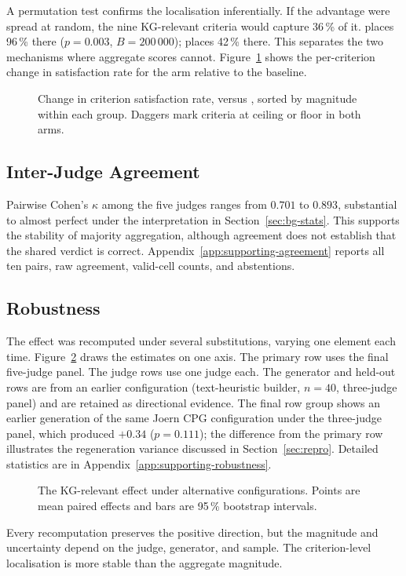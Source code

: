 A permutation test confirms the localisation inferentially. If the advantage
were spread at random, the nine KG-relevant criteria would capture 36\,\% of
it. \kg{} places 96\,\% there ($p = 0.003$, $B =
200\,000$); \rag{} places 42\,\% there. This separates the two
mechanisms where aggregate scores cannot.
Figure~\ref{fig:criterion-localisation} shows the per-criterion change in
satisfaction rate for the \kg{} arm relative to the baseline.

\begin{figure}[htbp]
    \centering
    
    \caption{Change in criterion satisfaction rate, \kg{} versus \baseline{},
             sorted by magnitude within each group. Daggers mark criteria at
             ceiling or floor in both arms.}
    \label{fig:criterion-localisation}
\end{figure}

\subsection{Inter-Judge Agreement}
\label{sec:results-exp1-agreement}

Pairwise Cohen's $\kappa$ among the five judges ranges from $0.701$ to
$0.893$, substantial to almost perfect under the interpretation in
Section~\ref{sec:bg-stats}. This supports the stability of majority
aggregation, although agreement does not establish that the shared verdict is
correct. Appendix~\ref{app:supporting-agreement} reports all ten pairs,
raw agreement, valid-cell counts, and abstentions.

\subsection{Robustness}
\label{sec:results-exp1-robustness}

The effect was recomputed under several substitutions, varying one element
each time. Figure~\ref{fig:exp1-robustness} draws the estimates on one axis.
The primary row uses the final five-judge panel. The judge rows use one
judge each. The generator and held-out rows are from an earlier
configuration (text-heuristic builder, $n = 40$, three-judge panel) and are
retained as directional evidence. The final row group shows an earlier
generation of the same Joern CPG configuration under the three-judge panel,
which produced $+0.34$ ($p = 0.111$); the difference from the primary row
illustrates the regeneration variance discussed in Section~\ref{sec:repro}. Detailed statistics are in
Appendix~\ref{app:supporting-robustness}.

\begin{figure}[htbp]
    \centering
    
    \caption{The KG-relevant effect under alternative configurations. Points
             are mean paired effects and bars are 95\,\% bootstrap intervals.}
    \label{fig:exp1-robustness}
\end{figure}

Every recomputation preserves the positive direction, but the magnitude and
uncertainty depend on the judge, generator, and sample. The criterion-level
localisation is more stable than the aggregate magnitude.
